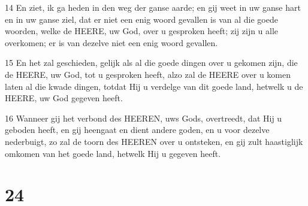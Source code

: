 \par 14 En ziet, ik ga heden in den weg der ganse aarde; en gij weet in uw ganse hart en in uw ganse ziel, dat er niet een enig woord gevallen is van al die goede woorden, welke de HEERE, uw God, over u gesproken heeft; zij zijn u alle overkomen; er is van dezelve niet een enig woord gevallen.
\par 15 En het zal geschieden, gelijk als al die goede dingen over u gekomen zijn, die de HEERE, uw God, tot u gesproken heeft, alzo zal de HEERE over u komen laten al die kwade dingen, totdat Hij u verdelge van dit goede land, hetwelk u de HEERE, uw God gegeven heeft.
\par 16 Wanneer gij het verbond des HEEREN, uws Gods, overtreedt, dat Hij u geboden heeft, en gij heengaat en dient andere goden, en u voor dezelve nederbuigt, zo zal de toorn des HEEREN over u ontsteken, en gij zult haastiglijk omkomen van het goede land, hetwelk Hij u gegeven heeft.

\chapter{24}

